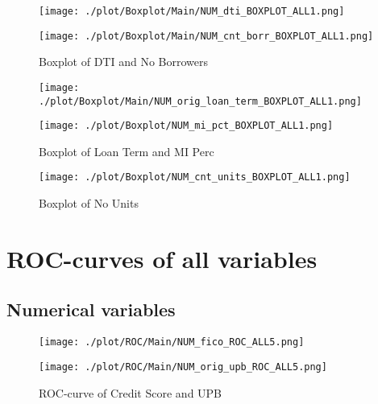 \begin{figure}[H]
\begin{minipage}{.5\textwidth}
	\centering
	\texttt{[image: ./plot/Boxplot/Main/NUM\_dti\_BOXPLOT\_ALL1.png]}
\end{minipage}%
\begin{minipage}{.5\textwidth}
	\centering
	\texttt{[image: ./plot/Boxplot/Main/NUM\_cnt\_borr\_BOXPLOT\_ALL1.png]}
\end{minipage}
    \caption{Boxplot of DTI and No Borrowers}
\end{figure}

\begin{figure}[H]
\begin{minipage}{.5\textwidth}
	\centering
	\texttt{[image: ./plot/Boxplot/Main/NUM\_orig\_loan\_term\_BOXPLOT\_ALL1.png]}
\end{minipage}%
\begin{minipage}{.5\textwidth}
	\centering
	\texttt{[image: ./plot/Boxplot/NUM\_mi\_pct\_BOXPLOT\_ALL1.png]}
\end{minipage}
    \caption{Boxplot of Loan Term and MI Perc}
\end{figure}

\begin{figure}[H]
	\centering
	\texttt{[image: ./plot/Boxplot/NUM\_cnt\_units\_BOXPLOT\_ALL1.png]}
    \caption{Boxplot of No Units}
\end{figure}

\section{ROC-curves of all variables}
\label{sec:ROC_all}

\subsection{Numerical variables}

\begin{figure}[H]
\begin{minipage}{.5\textwidth}
	\centering
	\texttt{[image: ./plot/ROC/Main/NUM\_fico\_ROC\_ALL5.png]}
\end{minipage}%
\begin{minipage}{.5\textwidth}
	\centering
	\texttt{[image: ./plot/ROC/Main/NUM\_orig\_upb\_ROC\_ALL5.png]}
\end{minipage}
    \caption{ROC-curve of Credit Score and UPB}
\end{figure}

